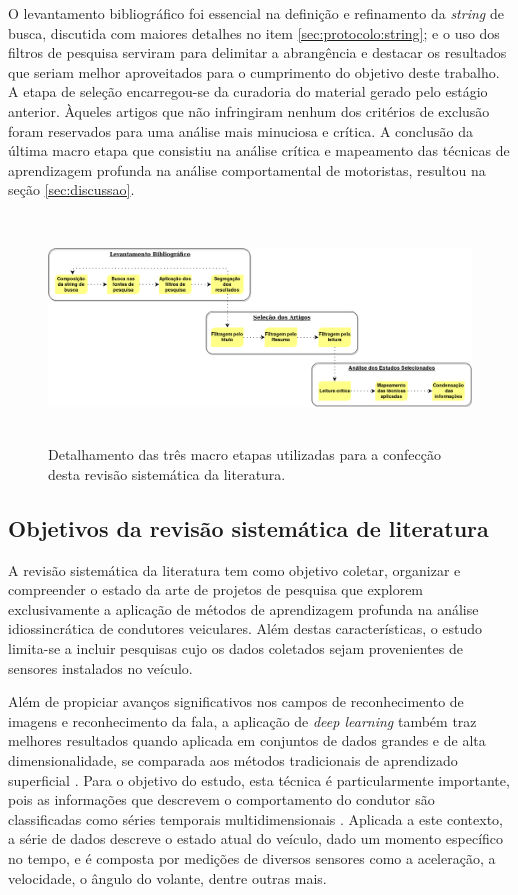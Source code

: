 \documentclass[10pt,journal,compsoc]{IEEEtran}
\begin{document}
O levantamento bibliográfico foi essencial na definição e refinamento da
\textit{string} de busca, discutida com maiores detalhes no item
\ref{sec:protocolo:string}; e o uso dos filtros de pesquisa serviram
para delimitar a abrangência e destacar os resultados que seriam
melhor aproveitados para o cumprimento do objetivo deste trabalho. A etapa
de seleção encarregou-se da curadoria do material gerado pelo estágio
anterior. Àqueles artigos que não infringiram nenhum dos critérios de
exclusão foram reservados para uma análise mais minuciosa e crítica. A
conclusão da última macro etapa que consistiu na análise crítica e mapeamento das
técnicas de aprendizagem profunda na análise comportamental de
motoristas, resultou na seção \ref{sec:discussao}.

\begin{figure}[!t]
\centering
\includegraphics[width=\textwidth, height=6cm]{etapas14}
\caption{Detalhamento das três macro etapas utilizadas para a
  confecção desta revisão sistemática da literatura.}
\label{fig:etapas}
\end{figure}

\subsection{Objetivos da revisão sistemática de literatura}
\label{sec:protocolo:objetivos}
A revisão sistemática da literatura tem como objetivo coletar,
organizar e compreender o estado da arte de projetos de pesquisa que
explorem exclusivamente a aplicação de métodos de aprendizagem
profunda na análise idiossincrática de condutores veiculares. Além
destas características, o estudo limita-se a incluir pesquisas cujo os
dados coletados sejam provenientes de sensores instalados no veículo.

Além de propiciar avanços significativos nos campos de reconhecimento
de imagens e reconhecimento da fala, a aplicação
de \textit{deep learning} também traz melhores resultados quando
aplicada em conjuntos de dados grandes e de alta dimensionalidade,
se comparada aos métodos tradicionais de aprendizado superficial
\cite{Lecun2015436}. Para o objetivo do estudo, esta técnica é particularmente
importante, pois as informações que descrevem o comportamento do condutor são
classificadas como séries temporais multidimensionais
\cite{Liu2018}. Aplicada a este contexto, a série de dados descreve o estado atual do veículo, dado um momento
específico no tempo, e é composta por medições de diversos sensores
como a aceleração, a velocidade, o ângulo do volante, dentre outras mais.
\end{document}
